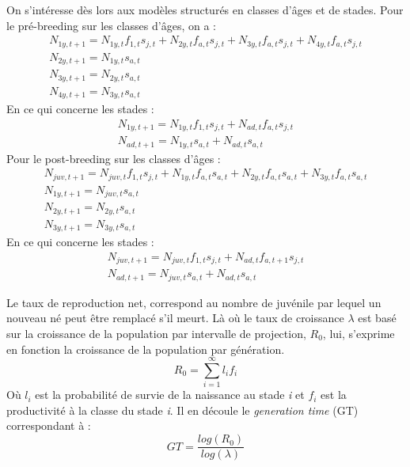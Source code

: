 \documentclass[12pt,a4paper]{article}
\begin{document}
On s'intéresse dès lors aux modèles structurés en classes d'âges et de stades. Pour le pré-breeding sur les classes d'âges, on a :
\begin{equation}
\begin{aligned}
N_{1y, t+1}=N_{1y, t}f_{1, t}s_{j, t}+N_{2y, t}f_{a, t}s_{j, t}+N_{3y, t}f_{a, t}s_{j, t}+N_{4y, t}f_{a, t}s_{j, t} \\
N_{2y, t+1}=N_{1y, t}s_{a, t} \\
N_{3y, t+1}=N_{2y, t}s_{a, t} \\
N_{4y, t+1}=N_{3y, t}s_{a, t}
\end{aligned}
\end{equation}
En ce qui concerne les stades :
\begin{equation}
\begin{aligned}
N_{1y, t+1}=N_{1y, t}f_{1, t}s_{j, t}+N_{ad, t}f_{a, t}s_{j, t} \\
N_{ad, t+1}=N_{1y, t}s_{a, t}+N_{ad, t}s_{a, t}
\end{aligned}
\end{equation}
Pour le post-breeding sur les classes d'âges :
\begin{equation}
\begin{aligned}
N_{juv, t+1}=N_{juv, t}f_{1, t}s_{j, t}+N_{1y, t}f_{a, t}s_{a, t}+N_{2y, t}f_{a, t}s_{a, t}+N_{3y, t}f_{a, t}s_{a, t} \\
N_{1y, t+1}=N_{juv, t}s_{a, t} \\
N_{2y, t+1}=N_{2y, t}s_{a, t} \\
N_{3y, t+1}=N_{3y, t}s_{a, t}
\end{aligned}
\end{equation}
En ce qui concerne les stades :
\begin{equation}
\begin{aligned}
N_{juv, t+1}=N_{juv, t}f_{1, t}s_{j, t}+N_{ad, t}f_{a, t+1}s_{j, t} \\
N_{ad, t+1}=N_{juv, t}s_{a, t}+N_{ad, t}s_{a, t}
\end{aligned}
\end{equation}

Le taux de reproduction net, correspond au nombre de juvénile par lequel un nouveau né peut être remplacé s'il meurt. Là où le taux de croissance $\lambda$ est basé sur la croissance de la population par intervalle de projection, $R_0$, lui, s'exprime en fonction la croissance de la population par génération.
\begin{equation}
R_{0}=\sum_{i=1}^{\infty}l_{i}f_{i}
\end{equation}
Où $l_i$ est la probabilité de survie de la naissance au stade \textit{i} et $f_i$ est la productivité à la classe du stade \textit{i}.
Il en découle le \textit{generation time} (GT) correspondant à : 
\begin{equation}
GT=\dfrac{log(R_0)}{log(\lambda)}
\end{equation}
\end{document}
